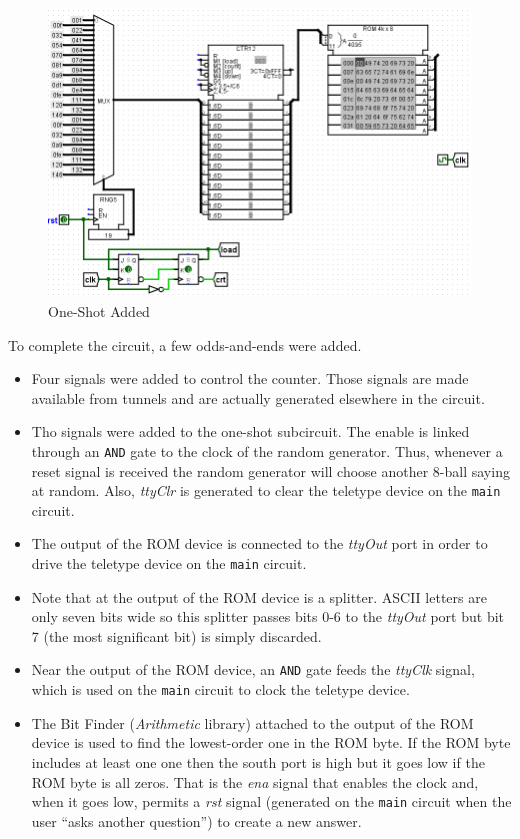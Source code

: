 \begin{figure}[H]
	\centering
	\includegraphics[width=\maxwidth{.95\linewidth}]{gfx/09-05}
	\caption{One-Shot Added}
	\label{fig:09-05}
\end{figure}

To complete the circuit, a few odds-and-ends were added.

\begin{itemize}
	\item Four signals were added to control the counter. Those signals are made available from tunnels and are actually generated elsewhere in the circuit.
	\item Tho signals were added to the one-shot subcircuit. The enable is linked through an \texttt{AND} gate to the clock of the random generator. Thus, whenever a reset signal is received the random generator will choose another 8-ball saying at random. Also, \textit{ttyClr} is generated to clear the teletype device on the \lstinline[columns=fixed]|main| circuit.
	\item The output of the ROM device is connected to the \textit{ttyOut} port in order to drive the teletype device on the \lstinline[columns=fixed]|main| circuit.
	\item Note that at the output of the ROM device is a splitter. ASCII letters are only seven bits wide so this splitter passes bits 0-6 to the \textit{ttyOut} port but bit 7 (the most significant bit) is simply discarded.
	\item Near the output of the ROM device, an \texttt{AND} gate feeds the \textit{ttyClk} signal, which is used on the \lstinline[columns=fixed]|main| circuit to clock the teletype device.
	\item The Bit Finder (\textit{Arithmetic} library) attached to the output of the ROM device is used to find the lowest-order one in the ROM byte. If the ROM byte includes at least one one then the south port is high but it goes low if the ROM byte is all zeros. That is the \textit{ena} signal that enables the clock and, when it goes low, permits a \textit{rst} signal (generated on the \lstinline[columns=fixed]|main| circuit when the user ``asks another question'') to create a new answer.
\end{itemize}

